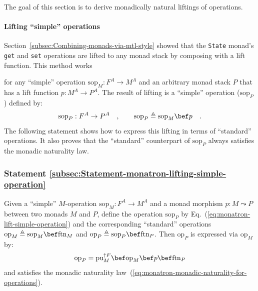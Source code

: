 \noindent The goal of this section is to derive monadically natural
liftings of operations.

\paragraph{Lifting \textquotedblleft simple\textquotedblright{} operations}

Section~\ref{subsec:Combining-monads-via-mtl-style} showed that
the \lstinline!State! monad\textsf{'}s \lstinline!get! and \lstinline!set!
operations are lifted to any monad stack by composing with a lift
function. This method works %

for any \textsf{``}simple\textsf{''} operation $\text{sop}_{M}:F^{A}\rightarrow M^{A}$
and an arbitrary monad stack $P$ that has a lift function $p:M^{A}\rightarrow P^{A}$.
The result of lifting is a \textsf{``}simple\textsf{''} operation ($\text{sop}_{P}$)
defined by:
\begin{equation}
\text{sop}_{P}:F^{A}\rightarrow P^{A}\quad,\quad\quad\text{sop}_{P}\triangleq\text{sop}_{M}\bef p\quad.\label{eq:monatron-lift-simple-operation}
\end{equation}
The following statement shows how to express this lifting in terms
of \textsf{``}standard\textsf{''} operations. It also proves that the \textsf{``}standard\textsf{''}
counterpart of $\text{sop}_{P}$ always satisfies the monadic naturality
law.

\subsubsection{Statement \label{subsec:Statement-monatron-lifting-simple-operation}\ref{subsec:Statement-monatron-lifting-simple-operation}}

Given a \textsf{``}simple\textsf{''} $M$-operation $\text{sop}_{M}:F^{A}\rightarrow M^{A}$
and a monad morphism $p:M\leadsto P$ between two monads $M$ and
$P$, define the operation $\text{sop}_{P}$ by Eq.~(\ref{eq:monatron-lift-simple-operation})
and the corresponding \textsf{``}standard\textsf{''} operations $\text{op}_{M}\triangleq\text{sop}_{M}\bef\text{ftn}_{M}$
and $\text{op}_{P}\triangleq\text{sop}_{P}\bef\text{ftn}_{P}$. Then
$\text{op}_{P}$ is expressed via $\text{op}_{M}$ by:
\begin{equation}
\text{op}_{P}=\text{pu}_{M}^{\uparrow F}\bef\text{op}_{M}\bef p\bef\text{ftn}_{P}\label{eq:monatron-lifting-simple-op}
\end{equation}
and satisfies the monadic naturality law~(\ref{eq:monatron-monadic-naturality-for-operations}). 

